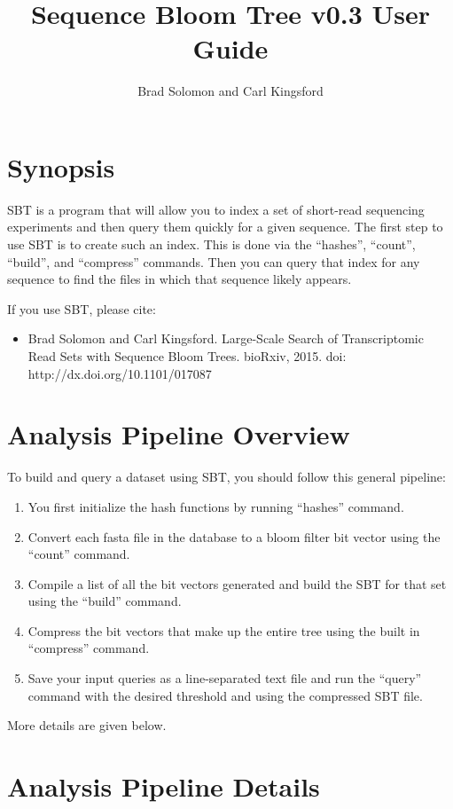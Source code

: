 \documentclass{article}
\title{Sequence Bloom Tree v0.3 User Guide}
\author{Brad Solomon and Carl Kingsford}
\begin{document}
\maketitle

\section{Synopsis}

SBT is a program that will allow you to index a set of short-read sequencing experiments and then query them quickly for a given sequence. The first step to use SBT is to create such an index. This is done via the ``hashes'', ``count'',  ``build'', and ``compress'' commands. Then you can query that index for any sequence to find the files in which that sequence likely appears.

If you use SBT, please cite:
\begin{itemize}
\item Brad Solomon and Carl Kingsford.
Large-Scale Search of Transcriptomic Read Sets with Sequence Bloom Trees. 
bioRxiv, 2015. doi: http://dx.doi.org/10.1101/017087
\end{itemize}

\section{Analysis Pipeline Overview}

To build and query a dataset using SBT, you should follow this general pipeline:
\begin{enumerate}
\item You first initialize the hash functions by running ``hashes'' command. 
\item Convert each fasta file in the database to a bloom filter bit vector using the  ``count'' command. 
\item Compile a list of all the bit vectors generated and build the SBT for that set using the ``build'' command.
\item Compress the bit vectors that make up the entire tree using the built in ``compress'' command.
\item Save your input queries as a line-separated text file and run the ``query'' command with the desired threshold and using the compressed SBT file.
\end{enumerate}
More details are given below.

\section{Analysis Pipeline Details}
\end{document}
